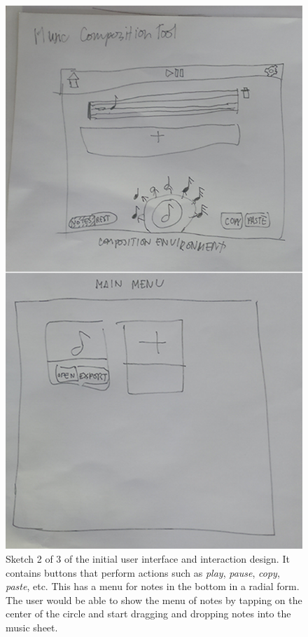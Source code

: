 			\begin{figure}[H]
				\centering
				\includegraphics[scale=0.3]{figures/initial-sketches-2.png}
			    \caption{Sketch 2 of 3 of the initial user interface and interaction design. It contains buttons that perform actions such as \textit{play}, \textit{pause}, \textit{copy}, \textit{paste}, etc. This has a menu for notes in the bottom in a radial form. The user would be able to show the menu of notes by tapping on the center of the circle and start dragging and dropping notes into the music sheet.}
			    \label{fig:initial_sketches_2}
			\end{figure}

